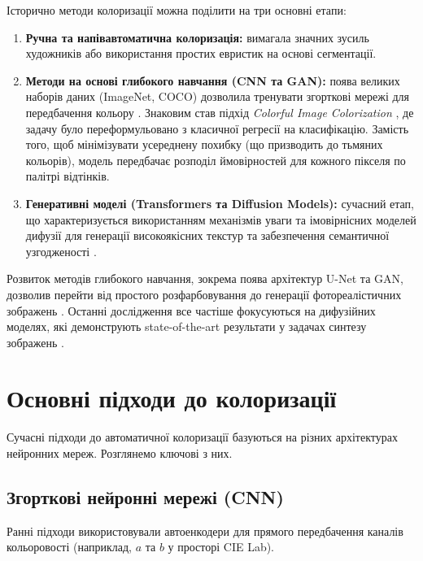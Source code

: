     Історично методи колоризації можна поділити на три основні етапи:
    \begin{enumerate}
        \item \textbf{Ручна та напівавтоматична колоризація:} вимагала значних зусиль художників або використання простих евристик на основі сегментації.
        \item \textbf{Методи на основі глибокого навчання (CNN та GAN):} поява великих наборів даних (ImageNet, COCO) дозволила тренувати згорткові мережі для передбачення кольору \cite{2016-deep-learning}.
                Знаковим став підхід \textit{Colorful Image Colorization} \cite{2016-colorful-image-colorization}, де задачу було переформульовано з класичної регресії на класифікацію.
                Замість того, щоб мінімізувати усереднену похибку (що призводить до тьмяних кольорів), модель передбачає розподіл ймовірностей для кожного пікселя по палітрі відтінків.
        \item \textbf{Генеративні моделі (Transformers та Diffusion Models):} сучасний етап, що характеризується використанням механізмів уваги та імовірнісних моделей дифузії для генерації високоякісних текстур та забезпечення семантичної узгодженості \cite{2023-diffusion-models-survey}.  %
    \end{enumerate}

    Розвиток методів глибокого навчання, зокрема поява архітектур U-Net та GAN, дозволив перейти від простого розфарбовування до генерації фотореалістичних зображень \cite{2017-image-to-image-translation}.
    Останні дослідження все частіше фокусуються на дифузійних моделях, які демонструють state-of-the-art результати у задачах синтезу зображень \cite{2022-palette-image-to-image-diffusion-models}.

\section{Основні підходи до колоризації}

    Сучасні підходи до автоматичної колоризації базуються на різних архітектурах нейронних мереж.
    Розглянемо ключові з них.

    \subsection{Згорткові нейронні мережі (CNN)}
        Ранні підходи використовували автоенкодери для прямого передбачення каналів кольоровості (наприклад, $a$ та $b$ у просторі CIE Lab).

